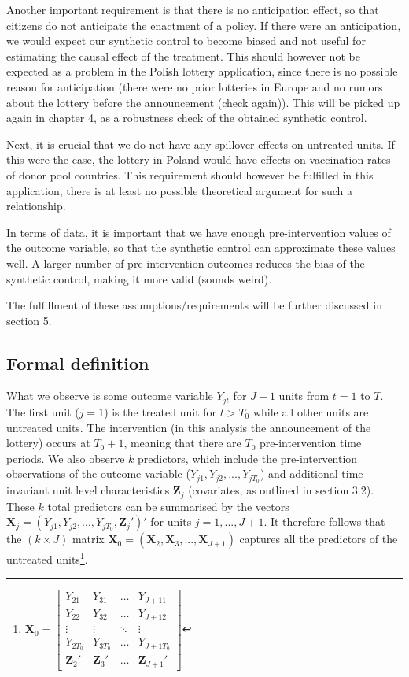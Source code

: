 \documentclass{scrbook}
\begin{document}
Another important requirement is that there is no anticipation effect,
so that citizens do not anticipate the enactment of a policy. If there
were an anticipation, we would expect our synthetic control to become
biased and not useful for estimating the causal effect of the treatment.
This should however not be expected as a problem in the Polish lottery
application, since there is no possible reason for anticipation (there
were no prior lotteries in Europe and no rumors about the lottery before
the announcement (check again)). This will be picked up again in chapter
4, as a robustness check of the obtained synthetic control.

Next, it is crucial that we do not have any spillover effects on
untreated units. If this were the case, the lottery in Poland would have
effects on vaccination rates of donor pool countries. This requirement
should however be fulfilled in this application, there is at least no
possible theoretical argument for such a relationship.

In terms of data, it is important that we have enough pre-intervention
values of the outcome variable, so that the synthetic control can
approximate these values well. A larger number of pre-intervention
outcomes reduces the bias of the synthetic control, making it more valid
(sounds weird).

The fulfillment of these assumptions/requirements will be further
discussed in section 5.

\subsection*{Formal definition}

What we observe is some outcome variable \(Y_{jt}\) for \(J + 1\) units
from \(t=1\) to \(T\). The first unit (\(j = 1\)) is the treated unit
for \(t>T_{0}\) while all other units are untreated units. The
intervention (in this analysis the announcement of the lottery) occurs
at \(T_{0}+1\), meaning that there are \(T_{0}\) pre-intervention time
periods. We also observe \(k\) predictors, which include the
pre-intervention observations of the outcome variable
(\(Y_{j1},Y_{j2},...,Y_{jT_{0}}\)) and additional time invariant unit
level characteristics \(\mathbf{Z}_{j}\) (covariates, as outlined in
section 3.2). These \(k\) total predictors can be summarised by the
vectors
\(\mathbf{X}_{j}=(Y_{j1},Y_{j2},...,Y_{jT_{0}},\mathbf{Z}_{j}')'\) for
units \(j=1,...,J + 1\). It therefore follows that the \((k\times J)\)
matrix
\(\mathbf{X}_{0}=(\mathbf{X}_{2},\mathbf{X}_{3},...,\mathbf{X}_{J + 1})\)
captures all the predictors of the untreated
units\footnote{\(\mathbf{X}_0=
\begin{bmatrix}
Y_{21} & Y_{31} & \dots & Y_{J+11}\\
Y_{22} & Y_{32} & \dots & Y_{J+12}\\
\vdots & \vdots & \ddots & \vdots\\
Y_{2T_{0}} & Y_{3T_{0}} & \dots & Y_{J+1T_{0}}\\
\mathbf{Z}_{2}' & \mathbf{Z}_{3}' & \dots & \mathbf{Z}_{J + 1}'
\end{bmatrix}\)}.
\end{document}
